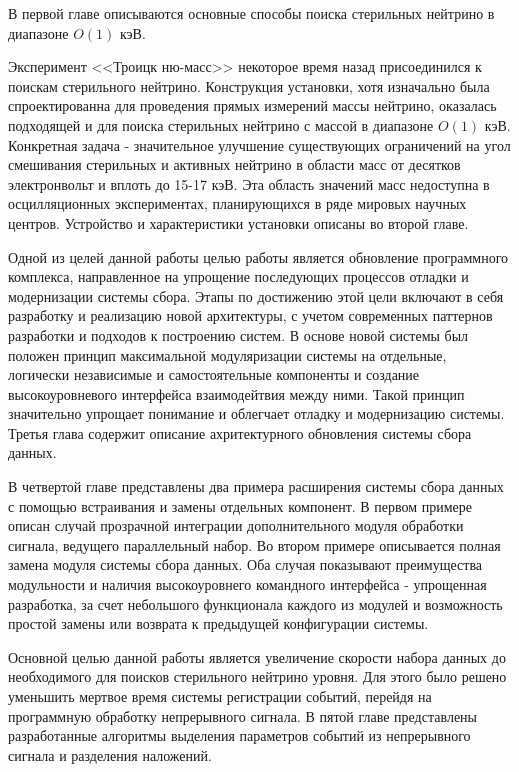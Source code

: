 \documentclass[a4paper,14pt]{extreport}
\begin{document}
В первой главе описываются основные способы поиска стерильных нейтрино в диапазоне $O(1)$ кэВ. 

Эксперимент <<Троицк ню-масс>> некоторое время назад присоединился к поискам стерильного нейтрино\cite{1703.10779}. Конструкция установки, хотя изначально была спроектированна для проведения прямых измерений массы нейтрино, оказалась подходящей и для поиска стерильных нейтрино с массой в диапазоне $O(1)$ кэВ. Конкретная задача - значительное улучшение существующих ограничений на угол смешивания стерильных и активных нейтрино в области масс от десятков электронвольт и вплоть до 15-17 кэВ. Эта область значений масс недоступна в осцилляционных экспериментах, планирующихся в ряде мировых научных центров. Устройство и характеристики установки описаны во второй главе.

Одной из целей данной работы целью работы является обновление программного комплекса, направленное на упрощение последующих процессов отладки и модернизации системы сбора. Этапы по достижению этой цели включают в себя разработку и реализацию новой архитектуры, с учетом современных паттернов разработки и подходов к построению систем. В основе новой системы был положен принцип максимальной модуляризации системы на отдельные, логически независимые и самостоятельные компоненты и создание высокоуровневого интерфейса взаимодейтвия между ними. Такой принцип значительно упрощает понимание и облегчает отладку и модернизацию системы. Третья глава содержит описание ахритектурного обновления системы сбора данных.

В четвертой главе представлены два примера расширения системы сбора данных с помощью встраивания и замены отдельных компонент. В первом примере описан случай прозрачной интеграции дополнительного модуля обработки сигнала, ведущего параллельный набор. Во втором примере описывается полная замена модуля системы сбора данных. Оба случая показывают преимущества модульности и наличия высокоуровнего командного интерфейса - упрощенная разработка, за счет небольшого функционала каждого из модулей и возможность простой замены или возврата к предыдущей конфигурации системы.

Основной целью данной работы является увеличение скорости набора данных до необходимого для поисков стерильного нейтрино уровня. Для этого было решено уменьшить мертвое время системы регистрации событий, перейдя на программную обработку непрерывного сигнала. В пятой главе представлены разработанные алгоритмы выделения параметров событий из непрерывного сигнала и разделения наложений.
\end{document}
